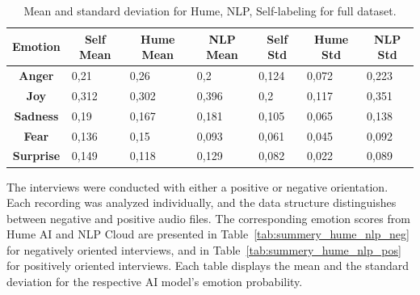 \begin{table}[H]
    \begin{tabular}{c|l|l|l|l|l|l}
    \textbf{Emotion}  & \multicolumn{1}{c|}{\textbf{Self Mean}} & \multicolumn{1}{c|}{\textbf{Hume Mean}} & \multicolumn{1}{c|}{\textbf{NLP Mean}} & \multicolumn{1}{c|}{\textbf{Self Std}} & \multicolumn{1}{c|}{\textbf{Hume Std}} & \multicolumn{1}{c}{\textbf{NLP Std}} \\ \hline
    \textbf{Anger}    & 0,21                                               & 0,26                                    & 0,2                                    & 0,124                                           & 0,072                                  & 0,223                                \\
    \textbf{Joy}      & 0,312                                              & 0,302                                   & 0,396                                  & 0,2                                             & 0,117                                  & 0,351                                \\
    \textbf{Sadness}  & 0,19                                               & 0,167                                   & 0,181                                  & 0,105                                           & 0,065                                  & 0,138                                \\
    \textbf{Fear}     & 0,136                                              & 0,15                                    & 0,093                                  & 0,061                                           & 0,045                                  & 0,092                                \\
    \textbf{Surprise} & 0,149                                              & 0,118                                   & 0,129                                  & 0,082                                           & 0,022                                  & 0,089                               
    \end{tabular}
    \caption{Mean and standard deviation for Hume, NLP, Self-labeling for full dataset.}
    \label{tab:summery_rq2_rq3}
\end{table}

The interviews were conducted with either a positive or negative orientation. Each recording was analyzed individually, and
the data structure distinguishes between negative and positive audio files. The corresponding emotion scores from Hume AI and 
NLP Cloud are presented in Table~\ref{tab:summery_hume_nlp_neg} for negatively oriented interviews, and in Table~\ref{tab:summery_hume_nlp_pos}
for positively oriented interviews. Each table displays the mean and the standard deviation for the respective AI model's emotion probability. 

